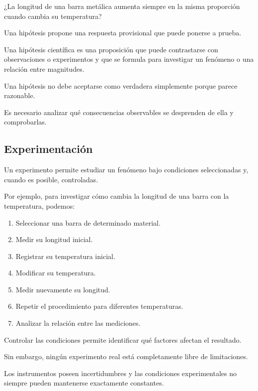 \begin{center}
¿La longitud de una barra metálica aumenta siempre
en la misma proporción cuando cambia su temperatura?
\end{center}

Una hipótesis propone una respuesta provisional
que puede ponerse a prueba.

\begin{definicion}

Una hipótesis científica es una proposición que puede
contrastarse con observaciones o experimentos y que
se formula para investigar un fenómeno o una relación
entre magnitudes.

\end{definicion}

Una hipótesis no debe aceptarse como verdadera
simplemente porque parece razonable.

Es necesario analizar qué consecuencias observables
se desprenden de ella y comprobarlas.

\subsection{Experimentación}

Un experimento permite estudiar un fenómeno bajo
condiciones seleccionadas y, cuando es posible,
controladas.

Por ejemplo, para investigar cómo cambia la longitud
de una barra con la temperatura, podemos:

\begin{enumerate}
    \item Seleccionar una barra de determinado material.
    \item Medir su longitud inicial.
    \item Registrar su temperatura inicial.
    \item Modificar su temperatura.
    \item Medir nuevamente su longitud.
    \item Repetir el procedimiento para diferentes temperaturas.
    \item Analizar la relación entre las mediciones.
\end{enumerate}

Controlar las condiciones permite identificar
qué factores afectan el resultado.

Sin embargo, ningún experimento real está completamente
libre de limitaciones.

Los instrumentos poseen incertidumbres y las condiciones
experimentales no siempre pueden mantenerse exactamente
constantes.


